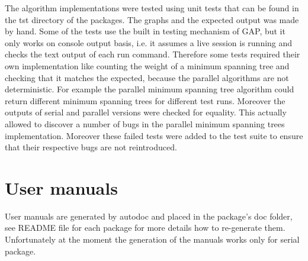 \documentclass{report}
\theoremstyle{plain}
\theoremstyle{definition}
\theoremstyle{remark}
\begin{document}
The algorithm implementations were tested using unit tests that can be found in the tst directory of the packages. The graphs and the expected output was made by hand. Some of the tests use the built in testing mechanism of GAP, but it only works on console output basis, i.e. it assumes a live session is running and checks the text output of each run command. Therefore some tests required their own implementation like counting the weight of a minimum spanning tree and checking that it matches the expected, because the parallel algorithms are not deterministic. For example the parallel minimum spanning tree algorithm could return different minimum spanning trees for different test runs. Moreover the outputs of serial and parallel versions were checked for equality. This actually allowed to discover a number of bugs in the parallel minimum spanning trees implementation. Moreover these failed tests were added to the test suite to ensure that their respective bugs are not reintroduced.

\section{User manuals}

User manuals are generated by autodoc and placed in the package's doc folder, see README file for each package for more details how to re-generate them. Unfortunately at the moment the generation of the manuals works only for serial package.



\end{document}
